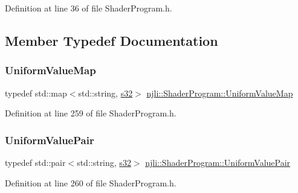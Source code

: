 Definition at line 36 of file Shader\+Program.\+h.



\subsection{Member Typedef Documentation}
\mbox{\label{classnjli_1_1_shader_program_a36ecea1b480769cf2a125e5fb13f122a}} 
\subsubsection{\texorpdfstring{Uniform\+Value\+Map}{UniformValueMap}}
{\footnotesize\ttfamily typedef std\+::map$<$std\+::string, \mbox{\hyperlink{_util_8h_aa62c75d314a0d1f37f79c4b73b2292e2}{s32}}$>$ \mbox{\hyperlink{classnjli_1_1_shader_program_a36ecea1b480769cf2a125e5fb13f122a}{njli\+::\+Shader\+Program\+::\+Uniform\+Value\+Map}}\hspace{0.3cm}{\ttfamily [private]}}



Definition at line 259 of file Shader\+Program.\+h.

\mbox{\label{classnjli_1_1_shader_program_a784188d8ab62d1eb541432ce756689a9}} 
\subsubsection{\texorpdfstring{Uniform\+Value\+Pair}{UniformValuePair}}
{\footnotesize\ttfamily typedef std\+::pair$<$std\+::string, \mbox{\hyperlink{_util_8h_aa62c75d314a0d1f37f79c4b73b2292e2}{s32}}$>$ \mbox{\hyperlink{classnjli_1_1_shader_program_a784188d8ab62d1eb541432ce756689a9}{njli\+::\+Shader\+Program\+::\+Uniform\+Value\+Pair}}\hspace{0.3cm}{\ttfamily [private]}}



Definition at line 260 of file Shader\+Program.\+h.




